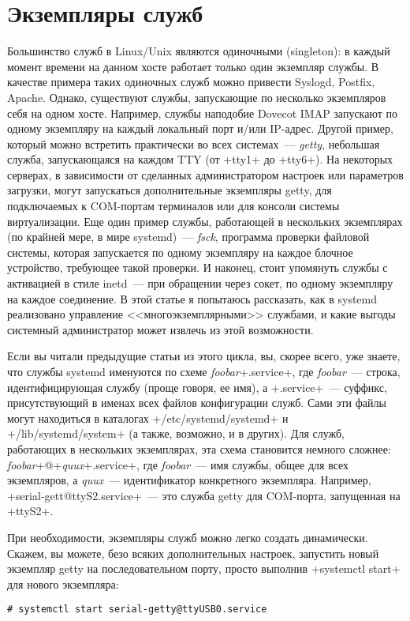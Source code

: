 \documentclass[10pt,oneside,a4paper]{article}
\begin{document}
\section{Экземпляры служб}

Большинство служб в Linux/Unix являются одиночными (singleton): в каждый момент
времени на данном хосте работает только один экземпляр службы. В качестве
примера таких одиночных служб можно привести Syslogd, Postfix, Apache. Однако,
существуют службы, запускающие по несколько экземпляров себя на одном хосте.
Например, службы наподобие Dovecot IMAP запускают по одному экземпляру на каждый
локальный порт и/или IP-адрес. Другой пример, который можно встретить
практически во всех системах~--- \emph{getty}, небольшая служба, запускающаяся на
каждом TTY (от +tty1+ до +tty6+). На некоторых серверах, в зависимости от
сделанных администратором настроек или параметров загрузки, могут запускаться
дополнительные экземпляры getty, для подключаемых к COM-портам терминалов или
для консоли системы виртуализации. Еще один пример службы, работающей в
нескольких экземплярах (по крайней мере, в мире systemd)~--- \emph{fsck},
программа проверки файловой системы, которая запускается по одному экземпляру
на каждое блочное устройство, требующее такой проверки. И наконец, стоит
упомянуть службы с активацией в стиле inetd~--- при обращении через сокет, по
одному экземпляру на каждое соединение. В этой статье я попытаюсь рассказать,
как в systemd реализовано управление <<многоэкземплярными>> службами, и какие
выгоды системный администратор может извлечь из этой возможности.

Если вы читали предыдущие статьи из этого цикла, вы, скорее всего, уже знаете,
что службы systemd именуются по схеме \emph{foobar}+.service+, где
\emph{foobar}~--- строка, идентифицирующая службу (проще говоря, ее имя), а
+.service+~--- суффикс, присутствующий в именах всех файлов конфигурации служб.
Сами эти файлы могут находиться в каталогах +/etc/systemd/systemd+ и
+/lib/systemd/system+ (а также, возможно, и в других). Для служб, работающих в
нескольких экземплярах, эта схема становится немного сложнее:
\emph{foobar}+@+\emph{quux}+.service+, где \emph{foobar}~--- имя службы,
общее для всех экземпляров, а \emph{quux}~--- идентификатор конкретного
экземпляра. Например, +serial-gett@ttyS2.service+~--- это служба getty для
COM-порта, запущенная на +ttyS2+.

При необходимости, экземпляры служб можно легко создать динамически. Скажем, вы
можете, безо всяких дополнительных настроек, запустить новый экземпляр getty на
последовательном порту, просто выполнив +systemctl start+ для нового экземпляра:
\begin{Verbatim}
# systemctl start serial-getty@ttyUSB0.service
\end{Verbatim}
\end{document}
